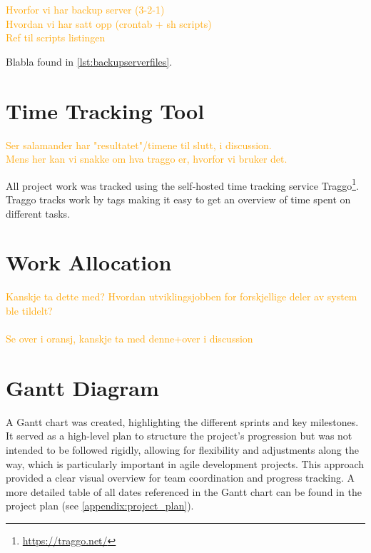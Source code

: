 \textcolor{orange}{
Hvorfor vi har backup server (3-2-1) \\
Hvordan vi har satt opp (crontab + sh scripts) \\
Ref til scripts listingen
}

\begin{figure}[h]

\end{figure}

Blabla found in \autoref{lst:backupserverfiles}.

\begin{figure}[h]

\end{figure}

\section{Time Tracking Tool}

\textcolor{orange}{
Ser salamander har "resultatet"/timene til slutt, i discussion. \\
Mens her kan vi snakke om hva traggo er, hvorfor vi bruker det.
}

All project work was tracked using the self-hosted time tracking service Traggo\footnote{\url{https://traggo.net/}}. Traggo tracks work by tags making it easy to get an overview of time spent on different tasks.

\section{Work Allocation}

\textcolor{orange}{Kanskje ta dette med? Hvordan utviklingsjobben for forskjellige deler av system ble tildelt? \\ \\
Se over i oransj, kanskje ta med denne+over i discussion}

\section{Gantt Diagram}

A Gantt chart was created, highlighting the different sprints and key milestones. It served as a high-level plan to structure the project's progression but was not intended to be followed rigidly, allowing for flexibility and adjustments along the way, which is particularly important in agile development projects. This approach provided a clear visual overview for team coordination and progress tracking. A more detailed table of all dates referenced in the Gantt chart can be found in the project plan (see \autoref{appendix:project_plan}).

